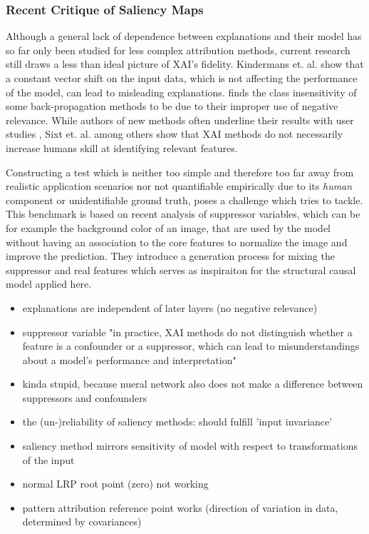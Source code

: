 \subsubsection{Recent Critique of Saliency Maps}

Although a general lack of dependence between explanations and their model \cite{Adebayo2018,Karimi2023} has so far only been studied for less complex attribution methods, current research still draws a less than ideal picture of XAI's fidelity.
Kindermans et. al. \cite{Kindermans2019} show that a constant vector shift on the input data, which is not affecting the performance of the model, can lead to misleading explanations. \cite{Sixt2020} finds the class insensitivity of some back-propagation methods to be due to their improper use of negative relevance.
While authors of new methods often underline their results with user studies , Sixt et. al. \cite{Sixt2022a} among others  show that XAI methods do not necessarily increase humans skill at identifying relevant features.

Constructing a test which is neither too simple and therefore too far away from realistic application scenarios nor not quantifiable empirically due to its \textit{human} component or unidentifiable ground truth, poses a challenge which \cite{Clark2023} tries to tackle. This benchmark is based on recent analysis \cite{Wilming2023} of suppressor variables, which can be for example the background color of an image, that are used by the model without having an association to the core features to normalize the image and improve the prediction. 
They introduce a generation process for mixing the suppressor and real features which serves as inspiraiton for the structural causal model applied here. 

\begin{itemize}
      \item explanations are independent of later layers (no negative relevance) \cite{Sixt2020}
      \item suppressor variable "in practice, XAI methods do not distinguish whether a feature is a confounder or a suppressor, which can lead to misunderstandings about a model's performance and interpretation"
      \item kinda stupid, because nueral network also does not make a difference between suppressors and confounders \cite{Wilming2023}
      \item the (un-)reliability of saliency methods: should fulfill 'input invariance'
      \item saliency method mirrors sensitivity of model with respect to transformations of the input
      \item normal LRP root point (zero) not working
      \item pattern attribution reference point works (direction of variation in data, determined by covariances) \cite{Kindermans2019}
\end{itemize}

